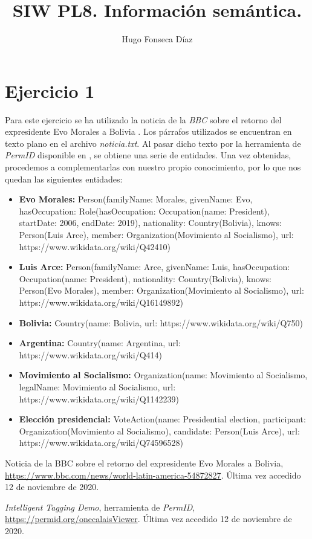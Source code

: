 \documentclass[11pt]{article}
\begin{document}
\title{SIW PL8. Información semántica.}
\author{Hugo Fonseca Díaz\\ }
\maketitle
\section{Ejercicio 1}
Para este ejercicio se ha utilizado la noticia de la \textit{BBC} sobre el retorno del expresidente Evo Morales a Bolivia \cite{bbcevomorales}. Los párrafos utilizados se encuentran en texto plano en el archivo \textit{noticia.txt}. Al pasar dicho texto por la herramienta de \textit{PermID} disponible en \cite{permidtool}, se obtiene una serie de entidades. Una vez obtenidas, procedemos a complementarlas con nuestro propio conocimiento, por lo que nos quedan las siguientes entidades:

\begin{itemize}
    \item \textbf{Evo Morales:} Person(familyName: Morales, givenName: Evo, hasOccupation: Role(hasOccupation: Occupation(name: President), startDate: 2006, endDate: 2019), nationality: Country(Bolivia), knows: Person(Luis Arce), member: Organization(Movimiento al Socialismo), url: https://www.wikidata.org/wiki/Q42410)
    \item \textbf{Luis Arce:} Person(familyName: Arce, givenName: Luis, hasOccupation: Occupation(name: President), nationality: Country(Bolivia), knows: Person(Evo Morales), member: Organization(Movimiento al Socialismo), url: https://www.wikidata.org/wiki/Q16149892)
    \item \textbf{Bolivia:} Country(name: Bolivia, url: https://www.wikidata.org/wiki/Q750)
    \item \textbf{Argentina:} Country(name: Argentina, url: https://www.wikidata.org/wiki/Q414)
    \item \textbf{Movimiento al Socialismo:} Organization(name: Movimiento al Socialismo, legalName: Movimiento al Socialismo, url: https://www.wikidata.org/wiki/Q1142239)
    \item \textbf{Elección presidencial:} VoteAction(name: Presidential election, participant: Organization(Movimiento al Socialismo), candidate: Person(Luis Arce), url: https://www.wikidata.org/wiki/Q74596528)
\end{itemize}
\begin{thebibliography}{8}
Noticia de la BBC sobre el retorno del expresidente Evo Morales a Bolivia, \url{https://www.bbc.com/news/world-latin-america-54872827}. Última vez accedido 12 de noviembre de 2020.

\textit{Intelligent Tagging Demo}, herramienta de \textit{PermID}, \url{https://permid.org/onecalaisViewer}. Última vez accedido 12 de noviembre de 2020.
\end{thebibliography}
\end{document}
